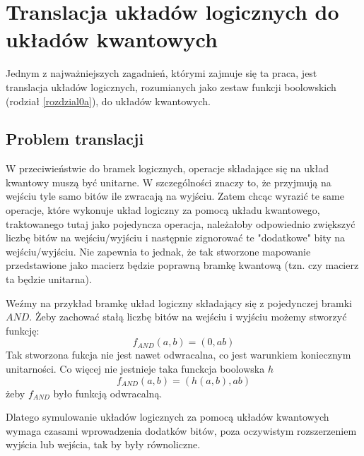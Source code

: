 \chapter{Translacja układów logicznych do układów kwantowych}
\thispagestyle{chapterBeginStyle}
\label{rozdzial2a}
Jednym z najważniejszych zagadnień, którymi zajmuje się ta praca, jest translacja układów logicznych, rozumianych jako zestaw funkcji boolowskich (rodział \ref{rozdzial0a}), do układów kwantowych.
\section{Problem translacji}
W przeciwieństwie do bramek logicznych, operacje składające się na układ kwantowy muszą być unitarne. W szczególności znaczy to, że przyjmują na wejściu tyle samo bitów ile zwracają na wyjściu. Zatem chcąc wyrazić te same operacje, które wykonuje układ logiczny za pomocą układu kwantowego, traktowanego tutaj jako pojedyncza operacja, należałoby odpowiednio zwiększyć liczbę bitów na wejściu/wyjściu i następnie zignorować te "dodatkowe" bity na wejściu/wyjściu. Nie zapewnia to jednak, że tak stworzone mapowanie przedstawione jako macierz będzie poprawną bramkę kwantową (tzn. czy macierz ta będzie unitarna).
\par Weźmy na przykład bramkę układ logiczny składający się z pojedynczej bramki $AND$. Żeby zachować stałą liczbę bitów na wejściu i wyjściu możemy stworzyć funkcję:
\[f_{AND}(a,b) = (0, ab)\]
Tak stworzona fukcja nie jest nawet odwracalna, co jest warunkiem koniecznym unitarności. Co więcej nie jestnieje taka funckcja boolowska $h$
\[f_{AND}(a,b) = (h(a,b), ab)\]
żeby $f_{AND}$ było funkcją odwracalną.
\par Dlatego symulowanie układów logicznych za pomocą układów kwantowych wymaga czasami wprowadzenia dodatków bitów, poza oczywistym rozszerzeniem wyjścia lub wejścia, tak by były równoliczne.
